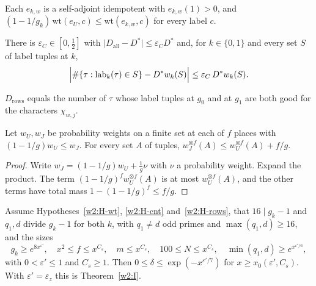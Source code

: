 \begin{hypothesis}\label{w2:H-wt}
Each $e_{k,w}$ is a self-adjoint idempotent with $e_{k,w}(1)>0$, and $(1-1/g_k)\,\mathrm{wt}(e_U,c)\le\mathrm{wt}(e_{k,w},c)$ for every label $c$.
\end{hypothesis}

\begin{hypothesis}\label{w2:H-cnt}
There is $\varepsilon_C\in[0,\tfrac12]$ with $\lvert D_{\mathrm{all}}-D^*\rvert\le\varepsilon_CD^*$ and, for $k\in\{0,1\}$ and every set $S$ of label tuples at $k$,
\[
\Bigl\lvert\#\{\tau:\mathrm{lab}_k(\tau)\in S\}-D^*w_k(S)\Bigr\rvert\le\varepsilon_C\,D^*w_k(S).
\]
\end{hypothesis}

\begin{hypothesis}\label{w2:H-rows}
$D_{\mathrm{rows}}$ equals the number of $\tau$ whose label tuples at $g_0$ and at $g_1$ are both good for the characters $\chi_{w,j}$.
\end{hypothesis}

\begin{lemma}\label{w2:transfer}
Let $w_U,w_J$ be probability weights on a finite set at each of $f$ places with $(1-1/g)w_U\le w_J$. For every set $A$ of tuples, $w_J^{\otimes f}(A)\le w_U^{\otimes f}(A)+f/g$.
\end{lemma}

\begin{proof}
Write $w_J=(1-1/g)w_U+\tfrac1g\nu$ with $\nu$ a probability weight. Expand the product. The term $(1-1/g)^fw_U^{\otimes f}(A)$ is at most $w_U^{\otimes f}(A)$, and the other terms have total mass $1-(1-1/g)^f\le f/g$.
\end{proof}

\begin{theorem}\label{w2:Iproof}
Assume Hypotheses~\ref{w2:H-wt}, \ref{w2:H-cnt} and~\ref{w2:H-rows}, that $16\mid g_k-1$ and $q_1,d$ divide $g_k-1$ for both $k$, with $q_1\ne d$ odd primes and $\max(q_1,d)\ge16$, and the sizes
\begin{equation}\label{w2:sizes}
g_k\ge e^{8x^{\varepsilon'}},\quad x^2\le f\le x^{C_s},\quad m\le x^{C_s},\quad100\le N\le x^{C_s},\quad\min(q_1,d)\ge e^{x^{\varepsilon'/6}},
\end{equation}
with $0<\varepsilon'\le1$ and $C_s\ge1$. Then $0\le\delta\le\exp(-x^{\varepsilon'/7})$ for $x\ge x_0(\varepsilon',C_s)$. With $\varepsilon'=\varepsilon_z$ this is Theorem~\ref{w2:I}.
\end{theorem}

